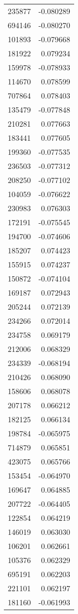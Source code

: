 \begin{tabular}{lr}
235877 & -0.080289 \\
694146 & -0.080270 \\
101893 & -0.079668 \\
181922 & 0.079234 \\
159978 & -0.078933 \\
114670 & 0.078599 \\
707864 & 0.078403 \\
135479 & -0.077848 \\
210281 & 0.077663 \\
183441 & 0.077605 \\
199360 & -0.077535 \\
236503 & -0.077312 \\
208250 & -0.077102 \\
104059 & -0.076622 \\
230983 & 0.076303 \\
172191 & -0.075545 \\
194700 & -0.074606 \\
185207 & 0.074423 \\
155915 & 0.074237 \\
150872 & -0.074104 \\
169187 & 0.072943 \\
205244 & 0.072139 \\
234266 & 0.072014 \\
234758 & 0.069179 \\
212006 & 0.068329 \\
234339 & -0.068194 \\
210426 & 0.068090 \\
158606 & 0.068078 \\
207178 & 0.066212 \\
182125 & 0.066134 \\
198784 & -0.065975 \\
714879 & 0.065851 \\
423075 & 0.065766 \\
153454 & -0.064970 \\
169647 & 0.064885 \\
207722 & -0.064405 \\
122854 & 0.064219 \\
146019 & 0.063030 \\
106201 & 0.062661 \\
105376 & 0.062329 \\
695191 & 0.062203 \\
221101 & 0.062197 \\
181160 & -0.061993 \\

\end{tabular}
